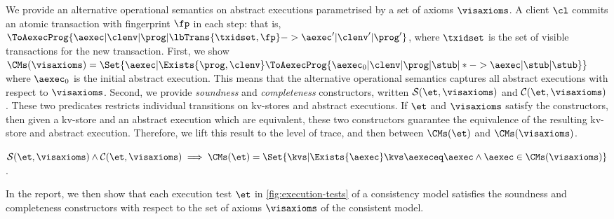 We provide an alternative operational semantics on abstract executions parametrised by a set of axioms \( \visaxioms \).
A client \( \cl \) commits an atomic transaction with fingerprint \( \fp \) in each step: that is,
\( \ToAexecProg{\aexec | \clenv | \prog | \lbTrans{\txidset,\fp} -> \aexec' | \clenv' | \prog'  }\),
where \( \txidset \) is the set of visible transactions for the new transaction.
First, we show 
\( \CMs(\visaxioms)  = \Set{\aexec | \Exists{\prog,\clenv} \ToAexecProg{\aexec_0 | \clenv | \prog | \stub | * -> \aexec | \stub | \stub  } } \)
where \( \aexec_0 \) is the initial abstract execution.
This means that the alternative operational semantics captures all abstract executions with respect to \( \visaxioms \).
Second, we provide \emph{soundness} and \emph{completeness} constructors,
written \(\mathcal{S}(\et,\visaxioms) \) and \(\mathcal{C}(\et,\visaxioms) \).
These two predicates restricts individual transitions on kv-stores and abstract executions.
If \( \et \)  and \( \visaxioms \) satisfy the constructors,
then given a kv-store and an abstract execution which are equivalent,
these two constructors guarantee the equivalence of the resulting kv-store and abstract execution.
Therefore, we lift this result to the level of trace, and then between \( \CMs(\et)\) and \( \CMs(\visaxioms) \).

\SpaceAboveDef
\begin{theorem}
\( \mathcal{S}(\et,\visaxioms) \land \mathcal{C}(\et,\visaxioms) \implies 
 \CMs(\et) = \Set{\kvs | \Exists{\aexec} \kvs \aexeceq \aexec \land \aexec \in \CMs(\visaxioms)} \).
\end{theorem}
\SpaceBelowDef

\noindent
In the report, we then show that each execution test \( \et \) in \cref{fig:execution-tests} of a consistency model satisfies
the soundness and completeness constructors
with respect to the set of axioms \( \visaxioms\) of the consistent model.

